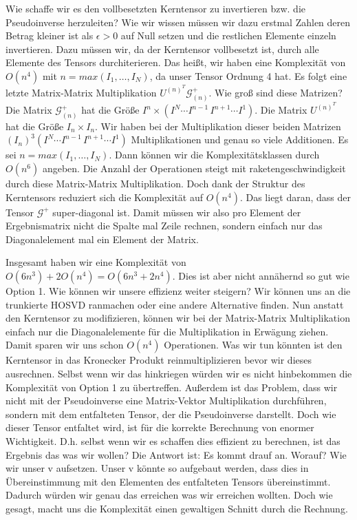 Wie schaffe wir es den vollbesetzten Kerntensor zu invertieren bzw. die Pseudoinverse herzuleiten? Wie wir wissen müssen wir dazu erstmal Zahlen deren Betrag kleiner ist als $\epsilon > 0$ auf Null setzen und die restlichen Elemente einzeln invertieren. 
Dazu müssen wir, da der Kerntensor vollbesetzt ist, durch alle Elemente des Tensors durchiterieren. Das heißt, wir haben eine Komplexität von $O(n^4)$ mit $n=max(I_1,\dots,I_N)$, da unser Tensor Ordnung 4 hat.
Es folgt eine letzte Matrix-Matrix Multiplikation $U^{ (n) ^{T} }  \mathscr{G}^{+}_{(n)}$. Wie groß sind diese Matrizen? Die Matrix $ \mathscr{G}^{+}_{(n)}$ hat die Größe $I^n \times (I^N \cdots I^{n-1} \, I^{n+1} \cdots I^1)$. Die Matrix  $U^{ (n) ^{T} }$ hat die Größe $I_n \times I_n$.  Wir haben bei der Multiplikation dieser beiden Matrizen $(I_n)^3 (I^N \cdots I^{n-1} \, I^{n+1} \cdots I^1)$ Multiplikationen und genau so viele Additionen. Es sei $n=max(I_1,\dots,I_N)$. Dann können wir die Komplexitätsklassen durch $O(n^6)$ angeben. Die Anzahl der Operationen steigt mit raketengeschwindigkeit durch diese Matrix-Matrix Multiplikation. Doch dank der Struktur des Kerntensors reduziert sich die Komplexität auf $O(n^4)$. Das liegt daran, dass der Tensor $ \mathscr{G}^{+}$ super-diagonal ist. Damit müssen wir also pro Element der Ergebnismatrix nicht die Spalte mal Zeile rechnen, sondern einfach nur das Diagonalelement mal ein Element der Matrix. 


Insgesamt haben wir eine Komplexität von $O(6n^3)+2O(n^4)=O(6n^3+2n^4)$. Dies ist aber nicht annähernd so gut wie Option 1. Wie können wir unsere effizienz weiter steigern?
Wir können uns an die trunkierte HOSVD ranmachen oder eine andere Alternative finden.
Nun anstatt den Kerntensor zu modifizieren, können wir bei der Matrix-Matrix Multiplikation einfach nur die Diagonalelemente für die Multiplikation in Erwägung ziehen. Damit sparen wir uns schon $O(n^4)$ Operationen. Was wir tun könnten ist den Kerntensor in das Kronecker Produkt reinmultiplizieren bevor wir dieses ausrechnen. Selbst wenn wir das hinkriegen würden wir es nicht hinbekommen die Komplexität von Option 1 zu übertreffen. Außerdem ist das Problem, dass wir nicht mit der Pseudoinverse eine Matrix-Vektor Multiplikation durchführen, sondern mit dem entfalteten Tensor, der die Pseudoinverse darstellt. Doch wie dieser Tensor entfaltet wird, ist für die korrekte Berechnung von enormer Wichtigkeit.
D.h. selbst wenn wir es schaffen dies effizient zu berechnen, ist das Ergebnis das was wir wollen?
Die Antwort ist: Es kommt drauf an. Worauf? Wie wir unser v aufsetzen. Unser v könnte so aufgebaut werden, dass dies in Übereinstimmung mit den Elementen des entfalteten Tensors übereinstimmt. Dadurch würden wir genau das erreichen was wir erreichen wollten. Doch wie gesagt, macht uns die Komplexität einen gewaltigen Schnitt durch die Rechnung.

